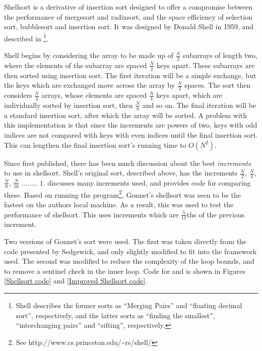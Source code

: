 \label{shell}

Shellsort is a derivative of insertion sort designed to offer a compromise
between the performance of mergesort and radixsort, and the space efficiency of
selection sort, bubblesort and insertion sort. It was designed by Donald Shell
in 1959, and described in \cite{Shell59}\footnote{Shell describes the former
sorts as ``Merging Pairs'' and ``floating decimal sort'', respectively, and the
latter sorts as ``finding the smallest'', ``interchanging pairs'' and ``sifting'',
respectively.}.

Shell begins by considering the array to be made up of $\frac{N}{2}$ subarrays
of length two, where the elements of the subarray are spaced $\frac{N}{2}$ keys
apart.  These subarrays are then sorted using insertion sort. The first
iteration will be a simple exchange, but the keys which are exchanged move
across the array by $\frac{N}{2}$ spaces. The sort then considers $\frac{N}{4}$
arrays, whose elements are spaced $\frac{N}{4}$ keys apart, which are
individually sorted by insertion sort, then $\frac{N}{8}$ and so on. The final
iteration will be a standard insertion sort, after which the array will be
sorted. A problem with this implementation is that since the increments are
powers of two, keys with odd indices are not compared with keys with even
indices until the final insertion sort. This can lengthen the final insertion
sort's running time to $O(N^2)$.

Since first published, there has been much discussion about the best
\textit{increments} to use in shellsort. Shell's original sort, described above,
has the increments $\frac{N}{2}$, $\frac{N}{4}$, $\frac{N}{8}$, $\frac{N}{16}$
........ $1$. \cite{Sedgewick96} discusses many increments used, and provides
code for comparing these. Based on running the  program\footnote{See
http://www.cs.princeton.edu/\textasciitilde{}rs/shell/}, Gonnet's shellsort was
seen to be the fastest on the authors local machine. As a result, this was used
to test the performance of shellsort. This uses increments which are
$\frac{5}{11}$ths of the previous increment.

Two versions of Gonnet's sort were used. The first was taken directly from the
code presented by Sedgewick, and only slightly modified to fit into the
framework used.  The second was modified to reduce the complexity of the loop
bounds, and to remove a sentinel check in the inner loop. Code for
 and  is shown in Figures \ref{Shellsort
code} and \ref{Improved Shellsort code}.

